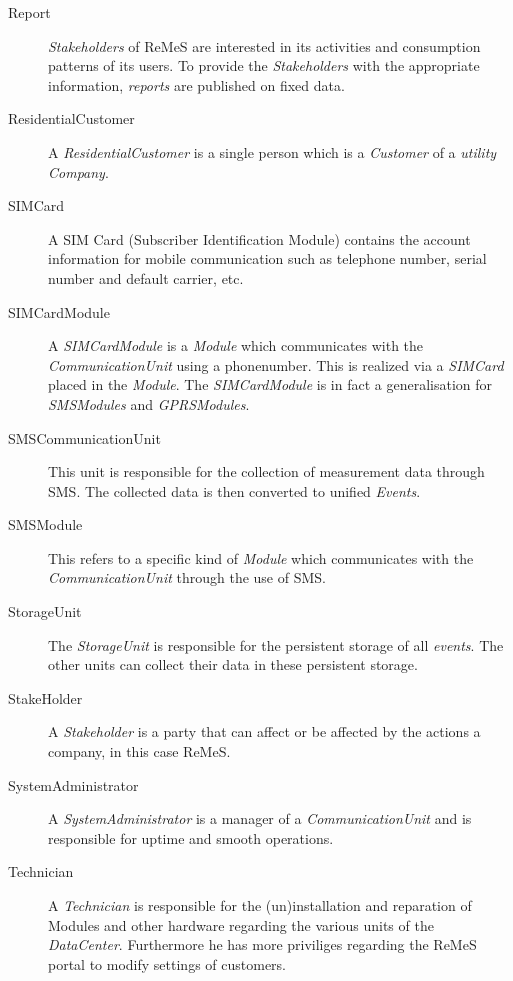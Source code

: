 \begin{description}
\item[Report] \emph{Stakeholders} of ReMeS are interested in its activities and
consumption patterns of its users. To provide the \emph{Stakeholders} with the
appropriate information, \emph{reports} are published on fixed data.

\item[ResidentialCustomer] A \emph{ResidentialCustomer} is a single person which
is a \emph{Customer} of a \emph{utility} \emph{Company}. 

\item[SIMCard] A SIM Card (Subscriber Identification Module) contains the
account information for mobile communication such as telephone number, serial
number and default carrier, etc.

\item[SIMCardModule] A \emph{SIMCardModule} is a \emph{Module} which
communicates with the \emph{CommunicationUnit} using a phonenumber. This is
realized via a \emph{SIMCard} placed in the \emph{Module}. The
\emph{SIMCardModule} is in fact a generalisation for \emph{SMSModules} and
\emph{GPRSModules}.

\item[SMSCommunicationUnit] This unit is responsible for the collection of
measurement data through SMS. The collected data is then converted to unified
\emph{Events}.

\item[SMSModule] This refers to a specific kind of \emph{Module} which
communicates with the \emph{CommunicationUnit} through the use of SMS.

\item[StorageUnit] The \emph{StorageUnit} is responsible for the persistent
storage of all \emph{events}. The other units can collect their data in these
persistent storage.

\item[StakeHolder]A \emph{Stakeholder} is a party that can affect or be
affected by the actions a company, in this case ReMeS.

\item[SystemAdministrator] A \emph{SystemAdministrator} is a manager of a
\emph{CommunicationUnit} and is responsible for uptime and smooth operations.

\item[Technician] A \emph{Technician} is responsible for the (un)installation
and reparation of Modules and other hardware regarding the various units of the
\emph{DataCenter}. Furthermore he has more priviliges regarding the ReMeS portal
to modify settings of customers.


\end{description}
